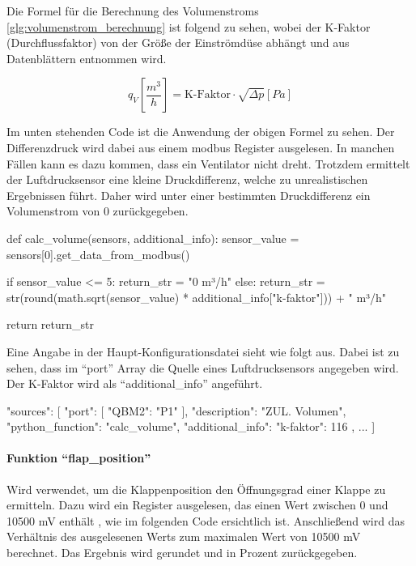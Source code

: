 Die Formel für die Berechnung des Volumenstroms \eqref{glg:volumenstrom_berechnung} ist folgend zu sehen, wobei der K-Faktor (Durchflussfaktor) \cite[vgl.][]{rox_klimatechnik:o.J.} von der Größe der Einströmdüse abhängt und aus Datenblättern entnommen wird. \cite[vgl.][171]{ebmpapst:2021}

\begin{equation}
	q_{V}\left[\frac{m^{3}}{h}\right] = \text{K-Faktor} \cdot \sqrt{\Delta p} \left[Pa\right]
	\label{glg:volumenstrom_berechnung}
\end{equation} 

Im unten stehenden Code ist die Anwendung der obigen Formel zu sehen. Der Differenzdruck wird dabei aus einem \gls{modbus} Register ausgelesen. In manchen Fällen kann es dazu kommen, dass ein Ventilator nicht dreht. Trotzdem ermittelt der Luftdrucksensor eine kleine Druckdifferenz, welche zu unrealistischen Ergebnissen führt. Daher wird unter einer bestimmten Druckdifferenz ein Volumenstrom von 0 zurückgegeben.

\begin{pythoncode}
def calc_volume(sensors, additional_info):
	sensor_value = sensors[0].get_data_from_modbus()
	
	if sensor_value <= 5:
		return_str = "0 m³/h"
	else:
		return_str = str(round(math.sqrt(sensor_value) * additional_info["k-faktor"])) + " m³/h"
	
	return return_str
\end{pythoncode}

Eine Angabe in der Haupt-Konfigurationsdatei sieht wie folgt aus. Dabei ist zu sehen, dass im \enquote{port} Array die Quelle eines Luftdrucksensors angegeben wird. Der K-Faktor wird als \enquote{additional\_info} angeführt.

\begin{jsoncode}
"sources": [
	{
		"port": [
			{"QBM2": "P1"}
		],
		"description": "ZUL. Volumen",
		"python_function": "calc_volume",
		"additional_info": {"k-faktor": 116}
	},
	...
]
\end{jsoncode}



\paragraph{Funktion \enquote{flap\_position}}
Wird verwendet, um die Klappenposition \bzw den Öffnungsgrad einer Klappe zu ermitteln. 
Dazu wird ein Register ausgelesen, das einen Wert zwischen 0 und 10500 mV enthält \cite[vgl.][17]{siemens:2021}, wie im folgenden Code ersichtlich ist. Anschließend wird das Verhältnis des ausgelesenen Werts zum maximalen Wert von 10500 mV berechnet. Das Ergebnis wird gerundet und in Prozent zurückgegeben.


